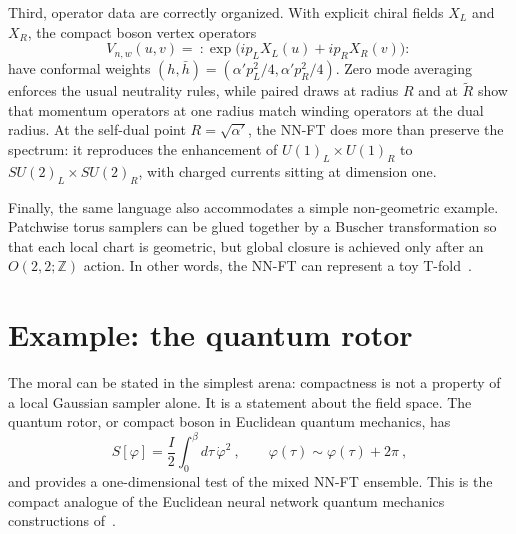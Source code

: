 \documentclass[11pt,a4paper]{article}
\newcommand\be{\begin{equation}}
\newcommand\ee{\end{equation}}
\begin{document}
Third, operator data are correctly organized. With explicit chiral fields $X_L$ and $X_R$, the compact boson vertex operators
\be
V_{n,w}(u,v) =\ :\!\exp\!\big(i p_L X_L(u)+i p_R X_R(v)\big)\!:\,
\label{eq:vertex}
\ee
have conformal weights $(h,\bar h)=(\alpha' p_L^2/4,\alpha' p_R^2/4)$. Zero mode averaging enforces the usual neutrality rules, while paired draws at radius $R$ and at $\widetilde R$ show that momentum operators at one radius match winding operators at the dual radius. At the self-dual point $R=\sqrt{\alpha'}$, the NN-FT does more than preserve the spectrum: it reproduces the enhancement of $U(1)_L\times U(1)_R$ to $SU(2)_L\times SU(2)_R$, with charged currents sitting at dimension one.

Finally, the same language also accommodates a simple non-geometric example. Patchwise torus samplers can be glued together by a Buscher transformation so that each local chart is geometric, but global closure is achieved only after an $O(2,2;\mathbb Z)$ action. In other words, the NN-FT can represent a toy T-fold~\cite{Hull:2004in,Hull:2006qs,Hull:2006va}.

\section{Example: the quantum rotor}
The moral can be stated in the simplest arena: compactness is not a property of a local Gaussian sampler alone. It is a statement about the field space. The quantum rotor, or compact boson in Euclidean quantum mechanics, has
\be
S[\varphi]=\frac{I}{2}\int_0^\beta d\tau\,\dot\varphi^2~,\qquad
\varphi(\tau)\sim\varphi(\tau)+2\pi~,
\label{eq:rotor_action}
\ee
and provides a one-dimensional test of the mixed NN-FT ensemble. This is the compact analogue of the Euclidean neural network quantum mechanics constructions of~\cite{Ferko:2025ogz}.
\end{document}
